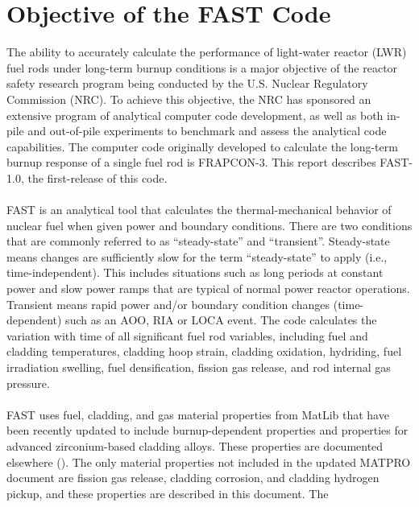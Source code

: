\section{Objective of the FAST Code} \label{section:objective}
The ability to accurately calculate the performance of light-water reactor (LWR) fuel rods under
long-term burnup conditions is a major objective of the reactor safety research program being
conducted by the U.S. Nuclear Regulatory Commission (NRC). To achieve this objective, the NRC has
sponsored an extensive program of analytical computer code development, as well as both in-pile and
out-of-pile experiments to benchmark and assess the analytical code capabilities. The computer code
originally developed to calculate the long-term burnup response of a single fuel rod is FRAPCON-3.
This report describes FAST-1.0, the first-release of this code.
\\
\\
FAST is an analytical tool that calculates the thermal-mechanical behavior of nuclear fuel when
given power and boundary conditions. There are two conditions that are commonly referred to as
``steady-state'' and ``transient''. Steady-state means changes are sufficiently slow for the term
``steady-state'' to apply (i.e., time-independent). This includes situations such as long periods at
constant power and slow power ramps that are typical of normal power reactor operations.  Transient
means rapid power and/or boundary condition changes (time-dependent) such as an AOO, RIA or LOCA
event.  The code calculates the variation with time of all significant fuel rod variables, including
fuel and cladding temperatures, cladding hoop strain, cladding oxidation, hydriding, fuel
irradiation swelling, fuel densification, fission gas release, and rod internal gas pressure.
\\
\\
FAST uses fuel, cladding, and gas material properties from MatLib that have been recently updated to
include burnup-dependent properties and properties for advanced zirconium-based cladding alloys.
These properties are documented elsewhere (\cite{ref:Luscher2014b}). The only
material properties not included in the updated MATPRO document are fission gas release, cladding
corrosion, and cladding hydrogen pickup, and these properties are described in this document. The
